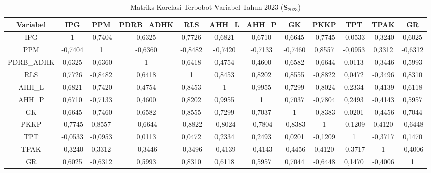 \begin{table}[H]
\centering
\caption{Matriks Korelasi Terbobot Variabel Tahun 2023 ($\mathbf{S}_{2023}$)} \label{tab:app1matriks_intra_loading_2023}
\begin{adjustbox}{max width=\textwidth, max height=0.85\textheight}
\begin{tabular}{|c|c|c|c|c|c|c|c|c|c|c|c|}
\hline
\textbf{Variabel} & \textbf{IPG} & \textbf{PPM} & \textbf{PDRB\_ADHK} & \textbf{RLS} & \textbf{AHH\_L} & \textbf{AHH\_P} & \textbf{GK} & \textbf{PKKP} & \textbf{TPT} & \textbf{TPAK} & \textbf{GR} \\
\hline
IPG & 1 & -0,7404 & 0,6325 & 0,7726 & 0,6821 & 0,6710 & 0,6645 & -0,7745 & -0,0533 & -0,3240 & 0,6025 \\
PPM & -0,7404 & 1 & -0,6360 & -0,8482 & -0,7420 & -0,7133 & -0,7460 & 0,8557 & -0,0953 & 0,3312 & -0,6312 \\
PDRB\_ADHK & 0,6325 & -0,6360 & 1 & 0,6418 & 0,4754 & 0,4600 & 0,6582 & -0,6644 & 0,0113 & -0,3446 & 0,5993 \\
RLS & 0,7726 & -0,8482 & 0,6418 & 1 & 0,8453 & 0,8202 & 0,8555 & -0,8822 & 0,0472 & -0,3496 & 0,8310 \\
AHH\_L & 0,6821 & -0,7420 & 0,4754 & 0,8453 & 1 & 0,9955 & 0,7299 & -0,8024 & 0,2334 & -0,4139 & 0,6118 \\
AHH\_P & 0,6710 & -0,7133 & 0,4600 & 0,8202 & 0,9955 & 1 & 0,7037 & -0,7804 & 0,2493 & -0,4143 & 0,5957 \\
GK & 0,6645 & -0,7460 & 0,6582 & 0,8555 & 0,7299 & 0,7037 & 1 & -0,8383 & 0,0201 & -0,4456 & 0,7044 \\
PKKP & -0,7745 & 0,8557 & -0,6644 & -0,8822 & -0,8024 & -0,7804 & -0,8383 & 1 & -0,1209 & 0,4120 & -0,6448 \\
TPT & -0,0533 & -0,0953 & 0,0113 & 0,0472 & 0,2334 & 0,2493 & 0,0201 & -0,1209 & 1 & -0,3717 & 0,1470 \\
TPAK & -0,3240 & 0,3312 & -0,3446 & -0,3496 & -0,4139 & -0,4143 & -0,4456 & 0,4120 & -0,3717 & 1 & -0,4006 \\
GR & 0,6025 & -0,6312 & 0,5993 & 0,8310 & 0,6118 & 0,5957 & 0,7044 & -0,6448 & 0,1470 & -0,4006 & 1 \\
\hline
\end{tabular}
\end{adjustbox}
\end{table}